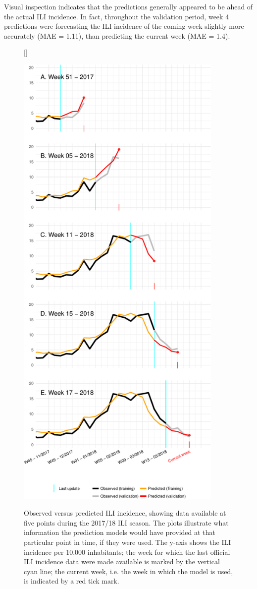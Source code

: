 \documentclass[]{article}
\begin{document}
Visual inspection indicates that the predictions generally appeared to
be ahead of the actual ILI incidence. In fact, throughout the validation
period, week 4 predictions were forecasting the ILI incidence of the
coming week slightly more accurately (MAE = 1.11), than predicting the
current week (MAE = 1.4).


\begin{figure}
[\FBwidth]
{\caption{Observed versus predicted ILI incidence, showing data available at five points during the 2017/18 ILI season. The plots illustrate what information the prediction models would have provided at that particular point in time, if they were used. The y-axis shows the ILI incidence per 10,000 inhabitants; the week for which the last official ILI incidence data were made available is marked by the vertical cyan line; the current week, i.e. the week in which the model is used, is indicated by a red tick mark.}\label{fig:test}}
{\includegraphics[width=10cm]{unnamed-chunk-4-1}}
\end{figure}
\end{document}
